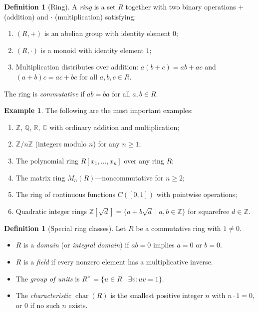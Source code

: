 \documentclass[12pt,a4paper]{amsart}
\theoremstyle{definition}
\newtheorem{definition}[theorem]{Definition}
\newtheorem{example}[theorem]{Example}
\theoremstyle{definition}
\DeclareMathOperator{\chr}{char}
\begin{document}
\begin{definition}[Ring]
A \emph{ring} is a set $R$ together with two binary operations $+$ (addition) and
$\cdot$ (multiplication) satisfying:
\begin{enumerate}[label=(\roman*)]
  \item $(R,+)$ is an abelian group with identity element $0$;
  \item $(R,\cdot)$ is a monoid with identity element $1$;
  \item Multiplication distributes over addition: $a(b+c) = ab + ac$ and
        $(a+b)c = ac + bc$ for all $a,b,c \in R$.
\end{enumerate}
The ring is \emph{commutative} if $ab = ba$ for all $a,b \in R$.
\end{definition}

\begin{example}\label{ex:rings}
The following are the most important examples:
\begin{enumerate}[label=(\alph*)]
  \item $\mathbb{Z}$, $\mathbb{Q}$, $\mathbb{R}$, $\mathbb{C}$ with ordinary
        addition and multiplication;
  \item $\mathbb{Z}/n\mathbb{Z}$ (integers modulo $n$) for any $n \geq 1$;
  \item The polynomial ring $R[x_1,\ldots,x_n]$ over any ring $R$;
  \item The matrix ring $M_n(R)$---noncommutative for $n \geq 2$;
  \item The ring of continuous functions $C([0,1])$ with pointwise operations;
  \item Quadratic integer rings $\mathbb{Z}[\sqrt{d}] = \{a + b\sqrt{d} \mid a,b \in \mathbb{Z}\}$
        for squarefree $d \in \mathbb{Z}$.
\end{enumerate}
\end{example}

\begin{definition}[Special ring classes]
Let $R$ be a commutative ring with $1 \neq 0$.
\begin{itemize}
  \item $R$ is a \emph{domain} (or \emph{integral domain}) if $ab = 0$ implies
        $a = 0$ or $b = 0$.
  \item $R$ is a \emph{field} if every nonzero element has a multiplicative inverse.
  \item The \emph{group of units} is $R^\times = \{u \in R \mid \exists v: uv = 1\}$.
  \item The \emph{characteristic} $\chr(R)$ is the smallest positive integer $n$ with
        $n \cdot 1 = 0$, or $0$ if no such $n$ exists.
\end{itemize}
\end{definition}
\end{document}
